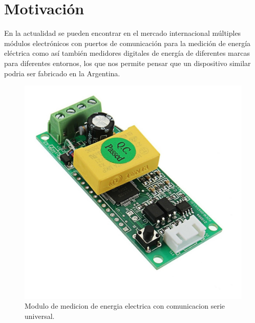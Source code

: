 \section{Motivación}

En la actualidad se pueden encontrar en el mercado internacional múltiples módulos electrónicos con puertos de comunicación para la medición de energía eléctrica como así también medidores digitales de energía de diferentes marcas para diferentes entornos, los que nos permite pensar que un dispositivo similar podria ser fabricado en la Argentina.

\begin{figure}[h]
	\centering
	\includegraphics[width=\textwidth]{./Figures/pzeem004.jpg}
	\caption{Modulo de medicion de energia electrica con comunicacion serie universal.}
	\label{fig:texmaker}
\end{figure}







